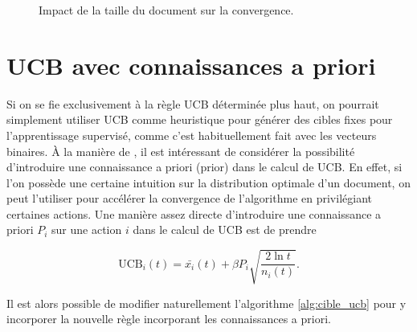 \begin{figure}[h!]
    \caption{Impact de la taille du document sur la convergence.}
    \label{fig:bandit_combi_doc_len}
\end{figure}

\section{UCB avec connaissances a priori}

Si on se fie exclusivement à la règle UCB déterminée plus haut, on pourrait simplement
utiliser UCB comme heuristique pour générer des cibles fixes pour l'apprentissage
supervisé, comme c'est habituellement fait avec les vecteurs binaires.
À la manière de \citep{alphago}, il est intéressant de considérer
 la possibilité d'introduire une connaissance a priori (prior)
dans le calcul de UCB.
En effet, si l'on possède une certaine intuition sur la distribution optimale d'un
document, on peut l'utiliser pour accélérer la convergence de l'algorithme en privilégiant
certaines actions.
Une manière assez directe d'introduire une connaissance a priori $P_i$ sur une action
$i$ dans le calcul de UCB est de prendre

\begin{equation}
    \text{UCB}_i(t) = \bar{x_i}(t) + \beta P_i \sqrt{\frac{2\ln t}{n_i(t)}}.
\end{equation}

Il est alors possible de modifier naturellement l'algorithme \ref{alg:cible_ucb} pour y
incorporer la nouvelle règle incorporant les connaissances a priori.

